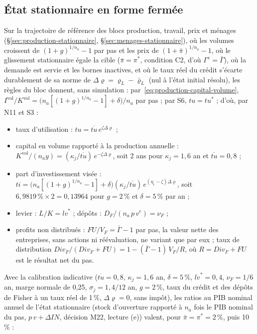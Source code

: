 \documentclass[11pt,a4paper]{article}
\begin{document}
\subsection{État stationnaire en forme fermée}
\label{sec:investissement-stationnaire}
\begin{proposee}
Sur la trajectoire de référence des blocs production, travail, prix et ménages (\S\ref{sec:production-stationnaire}, \S\ref{sec:menages-stationnaire}), où les volumes croissent de $(1 + g)^{1/n_a} - 1$ par pas et les prix de $(1 + \bar\pi)^{1/n_a} - 1$, où le glissement stationnaire égale la cible ($\bar\pi = \pi^\ast$, condition C2, d'où $\Gamma^e = \bar\Gamma$), où la demande est servie et les bornes inactives, et où le taux réel du crédit s'écarte durablement de sa norme de $\Delta\varrho = \varrho_L - \bar\varrho_L$ (nul à l'état initial résolu), les règles du bloc donnent, sans simulation : par~\eqref{eq:production-capital-volume}, $I^{\mathrm{vol}}/K^{\mathrm{vol}} = \bigl(n_a[(1 + g)^{1/n_a} - 1] + \delta\bigr)/n_a$ par pas ; par S6, $\mathit{tu} = \mathit{tu}^\ast$ ; d'où, par N11 et S3 :
\begin{itemize}
\item taux d'utilisation : $\mathit{tu} = \overline{\mathit{tu}}\, e^{\zeta\Delta\varrho}$ ;
\item capital en volume rapporté à la production annuelle : $K^{\mathrm{vol}}/(n_a y) = (\kappa_j/\overline{\mathit{tu}})\, e^{-\zeta\Delta\varrho}$, soit 2 ans pour $\kappa_j = 1{,}6$ an et $\overline{\mathit{tu}} = 0{,}8$ ;
\item part d'investissement visée : $\mathit{ti} = \bigl(n_a[(1 + g)^{1/n_a} - 1] + \delta\bigr)(\kappa_j/\overline{\mathit{tu}})\, e^{(\eta_r - \zeta)\Delta\varrho}$, soit $6{,}9819\,\% \times 2 = 0{,}13964$ pour $g = 2\,\%$ et $\delta = 5\,\%$ par an ;
\item levier : $L/K = \mathit{lv}^\ast$ ; dépôts : $D_F/(n_a\, p\, v^e) = \nu_F$ ;
\item profits non distribués : $\mathit{FU}/V_F = \bar\Gamma - 1$ par pas, la valeur nette des entreprises, sans actions ni réévaluation, ne variant que par eux ; taux de distribution $\mathit{Div}_F/(\mathit{Div}_F + \mathit{FU}) = 1 - (\bar\Gamma - 1)\,V_F/R$, où $R = \mathit{Div}_F + \mathit{FU}$ est le résultat net du pas.
\end{itemize}
Avec la calibration indicative ($\overline{\mathit{tu}} = 0{,}8$, $\kappa_j = 1{,}6$ an, $\delta = 5\,\%$, $\mathit{lv}^\ast = 0{,}4$, $\nu_F = 1/6$ an, marge normale de 0,25, $\sigma_j = 1{,}4/12$ an, $g = 2\,\%$, taux du crédit et des dépôts de Fisher à un taux réel de 1\,\%, $\Delta\varrho = 0$, sans impôt), les ratios au PIB nominal annuel de l'état stationnaire (stock d'ouverture rapporté à $n_a$ fois le PIB nominal du pas, $p\,v + \Delta\mathit{IN}$, décision M22, lecture (e)) valent, pour $\bar\pi = \pi^\ast = 2\,\%$, puis 10\,\% :

\end{proposee}
\end{document}
